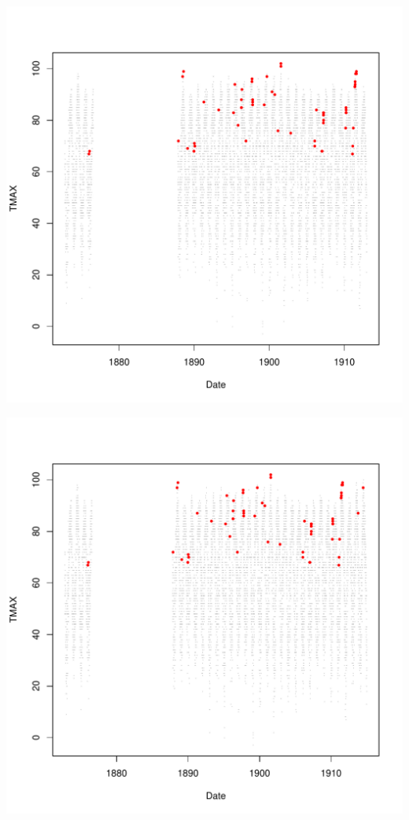 \documentclass{article}\usepackage[]{graphicx}\usepackage[]{color}
\makeatletter
\def\maxwidth{ %
  \ifdim\Gin@nat@width>\linewidth
    \linewidth
  \else
    \Gin@nat@width
  \fi
}
\newenvironment{knitrout}{}{} %
\makeatother
\begin{document}
\begin{knitrout}
\includegraphics[width=\maxwidth]{figure/unnamed-chunk-4-16} 

\includegraphics[width=\maxwidth]{figure/unnamed-chunk-4-17} 


\end{knitrout}
\end{document}
